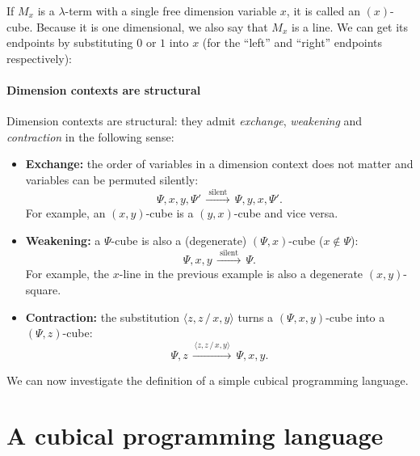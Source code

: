 \documentclass{article}
\newcommand\DimSubst[3]{#3\langle{#1}/{#2}\rangle}
\begin{document}
If $M_x$ is a $\lambda$-term with a single free dimension variable $x$, it
is called an $(x)$-cube. Because it is one dimensional, we also say that
$M_x$ is a line. We can get its endpoints by substituting $0$ or $1$ into $x$
(for the ``left'' and ``right'' endpoints respectively):

\begin{center}
\end{center}


\paragraph{Dimension contexts are structural}
  Dimension contexts are structural: they admit 
  \emph{exchange}, \emph{weakening} and \emph{contraction} in the following sense:
  \begin{itemize}
  \item \textbf{Exchange:} the order of variables in a dimension
    context does not matter and variables can be permuted silently:
    \[ \Psi, x, y, \Psi' \,\xrightarrow{\text{ silent }}\, \Psi, y, x, \Psi'.  \] 
    For example, an $(x,y)$-cube is a $(y,x)$-cube and vice versa.
  \item \textbf{Weakening:} 
    a $\Psi$-cube is also a (degenerate) $(\Psi, x)$-cube ($x \notin \Psi$):
    \[ \Psi, x, y \,\xrightarrow{\text{ silent }}\, \Psi.  \]
    For example, the $x$-line in the previous example is also a degenerate
    $(x, y)$-square.
  \item \textbf{Contraction:}
    the substitution $\langle z,z \,/\, x,y \rangle$ turns a $(\Psi, x, y)$-cube
    into a $(\Psi, z)$-cube:
    \[ \Psi, z \,\xrightarrow{\,\langle z,z \,/\, x,y \rangle\,}\, \Psi, x, y.  \]
  \end{itemize}

We can now investigate the definition of a simple cubical programming language.


\section{A cubical programming language}
\end{document}
